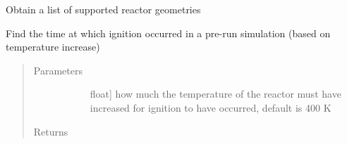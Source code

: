 \documentclass[letterpaper,10pt,english]{sphinxmanual}
\begin{document}
\begin{fulllineitems}

\begin{fulllineitems}
\label{\detokenize{spitfire.chemistry.reactors:spitfire.chemistry.reactors.HomogeneousReactor.get_supported_reactor_shapes}}
Obtain a list of supported reactor geometries

\end{fulllineitems}


\begin{fulllineitems}
\label{\detokenize{spitfire.chemistry.reactors:spitfire.chemistry.reactors.HomogeneousReactor.ignition_delay}}
Find the time at which ignition occurred in a pre-run simulation (based on temperature increase)
\begin{quote}\begin{description}
\item[{Parameters}] \leavevmode\begin{description}
\item[{}] \leavevmode{[}float{]}
how much the temperature of the reactor must have increased for ignition to have occurred, default is 400 K

\end{description}

\item[{Returns}] \leavevmode\begin{description}
\item[{}] \leavevmode
\end{description}

\end{description}\end{quote}

\end{fulllineitems}


\end{fulllineitems}
\end{document}
